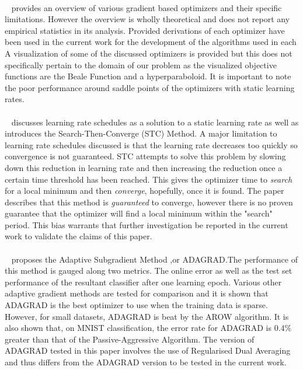 \documentclass{article}
\begin{document}
\paragraph{}~\citet{ruder2016overview} provides an overview of various gradient based optimizers and their specific limitations. However the overview is wholly theoretical and does not report any empirical statistics in its analysis.
Provided derivations of each optimizer have been used in the current work for the development of the algorithms used in each  A visualization of some of the discussed optimizers is provided but this does not specifically pertain to the domain of our problem as the visualized objective functions are the Beale Function and a hyperparaboloid. It is important to note the poor performance around saddle points of the optimizers with static learning rates.


\paragraph{}~\citet{darken1991note} discusses learning rate schedules as a solution to a static learning rate as well as introduces the Search-Then-Converge (STC) Method. A major limitation to learning rate schedules discussed is that the learning rate decreases too quickly so convergence is not guaranteed. STC attempts to solve this problem by slowing down this reduction in learning rate and then increasing the reduction once a certain time threshold has been reached. This gives the optimizer time to \textit{search} for a local minimum and then \textit{converge}, hopefully, once it is found. The paper describes that this method is \textit{guaranteed} to converge, however there is no proven guarantee that the optimizer will find a local minimum within the "search" period. This bias warrants that further investigation be reported in the current work to validate the claims of this paper.

\paragraph{}~\citet{duchi2011adaptive} proposes the Adaptive Subgradient Method ,or ADAGRAD.The performance of this method is gauged along two metrics. The online error as well as the test set performance of the resultant classifier after one learning epoch. Various other adaptive gradient methods are tested for comparison and it is shown that ADAGRAD is the best optimizer to use when the training data is sparse. However, for small datasets, ADAGRAD is beat by the AROW algorithm. It is also shown that, on MNIST classification, the error rate for ADAGRAD is 0.4\% greater than that of the Passive-Aggressive Algorithm. The version of ADAGRAD tested in this paper involves the use of Regularised Dual Averaging and thus differs from the ADAGRAD version to be tested in the current work.
\end{document}
